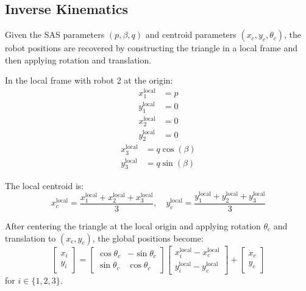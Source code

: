 \documentclass[lettersize,journal]{IEEEtran}
\begin{document}
\subsection{Inverse Kinematics}

Given the SAS parameters $(p, \beta, q)$ and centroid parameters $(x_c, y_c, \theta_c)$, the robot positions are recovered by constructing the triangle in a local frame and then applying rotation and translation.

In the local frame with robot 2 at the origin:
\begin{equation}
\begin{aligned}
x_1^{\text{local}} &= p \\
y_1^{\text{local}} &= 0
\end{aligned}
\end{equation}
\begin{equation}
\begin{aligned}
x_2^{\text{local}} &= 0 \\
y_2^{\text{local}} &= 0
\end{aligned}
\end{equation}
\begin{equation}
\begin{aligned}
x_3^{\text{local}} &= q\cos(\beta) \\
y_3^{\text{local}} &= q\sin(\beta)
\end{aligned}
\end{equation}

The local centroid is:
\begin{equation}
x_c^{\text{local}} = \frac{x_1^{\text{local}} + x_2^{\text{local}} + x_3^{\text{local}}}{3}, \quad y_c^{\text{local}} = \frac{y_1^{\text{local}} + y_2^{\text{local}} + y_3^{\text{local}}}{3}
\end{equation}

After centering the triangle at the local origin and applying rotation $\theta_c$ and translation to $(x_c, y_c)$, the global positions become:
\begin{equation}
\begin{bmatrix} x_i \\ y_i \end{bmatrix} = \begin{bmatrix} \cos\theta_c & -\sin\theta_c \\ \sin\theta_c & \cos\theta_c \end{bmatrix} \begin{bmatrix} x_i^{\text{local}} - x_c^{\text{local}} \\ y_i^{\text{local}} - y_c^{\text{local}} \end{bmatrix} + \begin{bmatrix} x_c \\ y_c \end{bmatrix}
\end{equation}
for $i \in \{1, 2, 3\}$.
\end{document}
